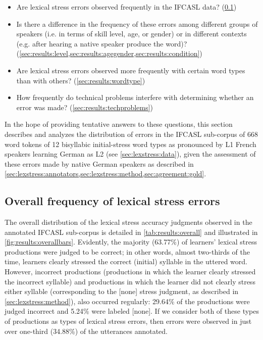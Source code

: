 		\begin{itemize}
	\item{Are lexical stress errors observed frequently in the IFCASL data? (\cref{sec:results:overall})}
	\item{Is there a difference in the frequency of these errors among different groups of speakers (i.e. in terms of skill level, age, or gender) or in different contexts (e.g. after hearing a native speaker produce the word)?  (\cref{sec:results:level,sec:results:agegender,sec:results:condition})}
	\item{Are lexical stress errors observed more frequently with certain word types than with others?  (\cref{sec:results:wordtype})}
	\item{How frequently do technical problems interfere with determining whether an error was made?  (\cref{sec:results:techproblems})}
	\end{itemize}
	
		In the hope of providing tentative answers to these questions, this section describes and analyzes the distribution of errors in the IFCASL sub-corpus of 668 word tokens of 12 bisyllabic initial-stress word types as pronounced by L1 French speakers learning German as L2 (see \cref{sec:lexstress:data}), given the assessment of these errors made by native German speakers as described in \cref{sec:lexstress:annotators,sec:lexstress:method,sec:agreement:gold}.
			
		\subsection{Overall frequency of lexical stress errors}
		\label{sec:results:overall}
		
		
		The overall distribution of the lexical stress accuracy judgments observed in the annotated IFCASL sub-corpus is detailed in \cref{tab:results:overall} and illustrated in \cref{fig:results:overallbars}. Evidently, the majority (63.77\%) of learners' lexical stress productions were judged to be correct; in other words, almost two-thirds of the time, learners 
		clearly stressed the correct (initial) syllable in the uttered word.
		However, incorrect productions (productions in which the learner clearly stressed the incorrect syllable) and productions in which the learner did not clearly stress either syllable (corresponding to the [none] stress judgment, as described in \cref{sec:lexstress:method}), also occurred regularly: 29.64\% of the productions were judged incorrect and 5.24\% were labeled [none]. If we consider both of these types of productions as types of lexical stress errors, then errors were observed in just over one-third (34.88\%) of the  utterances annotated. 
		
